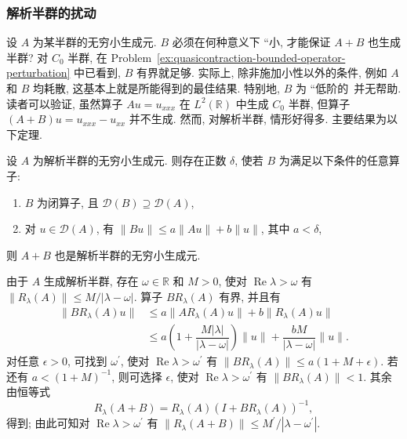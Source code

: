 \subsubsection{解析半群的扰动}\label{subsec:analytic-semigroup-perturbations}

设 $A$ 为某半群的无穷小生成元. $B$ 必须在何种意义下 ``小\textquotesingle\textquotesingle, 才能保证 $A+B$ 也生成半群? 对 $C_0$ 半群, 在 Problem~\ref{ex:quasicontraction-bounded-operator-perturbation} 中已看到, $B$ 有界就足够. 实际上, 除非施加小性以外的条件, 例如 $A$ 和 $B$ 均耗散, 这基本上就是所能得到的最佳结果. 特别地, $B$ 为 ``低阶的\textquotesingle\textquotesingle\ 并无帮助. 读者可以验证, 虽然算子 $Au=u_{xxx}$ 在 $L^2(\mathbb{R})$ 中生成 $C_0$ 半群, 但算子 $(A+B)u=u_{xxx}-u_{xx}$ 并不生成. 然而, 对解析半群, 情形好得多. 主要结果为以下定理.

\begin{Theorem}
\label{thm:analytic-generator-small-relative-perturbation}
设 $A$ 为解析半群的无穷小生成元. 则存在正数 $\delta$, 使若 $B$ 为满足以下条件的任意算子:\begin{enumerate}\item $B$ 为闭算子, 且 $\mathcal{D}(B)\supseteq\mathcal{D}(A)$,\item 对 $u\in\mathcal{D}(A)$, 有 $\|Bu\|\leq a\|Au\|+b\|u\|$, 其中 $a<\delta$,\end{enumerate}则 $A+B$ 也是解析半群的无穷小生成元.
\end{Theorem}

\begin{Proof}
由于 $A$ 生成解析半群, 存在 $\omega\in\mathbb{R}$ 和 $M>0$, 使对 $\operatorname{Re}\lambda>\omega$ 有 $\|R_\lambda(A)\|\leq M/|\lambda-\omega|$. 算子 $BR_\lambda(A)$ 有界, 并且有\[\begin{aligned}
\|BR_\lambda(A)u\|&\leq a\|AR_\lambda(A)u\|+b\|R_\lambda(A)u\|\\
&\leq a\left(1+\dfrac{M|\lambda|}{|\lambda-\omega|}\right)\|u\|+\dfrac{bM}{|\lambda-\omega|}\|u\|.
\end{aligned}\]对任意 $\epsilon>0$, 可找到 $\omega^{\prime}$, 使对 $\operatorname{Re}\lambda>\omega^{\prime}$ 有 $\|BR_\lambda(A)\|\leq a(1+M+\epsilon)$. 若还有 $a<(1+M)^{-1}$, 则可选择 $\epsilon$, 使对 $\operatorname{Re}\lambda>\omega^{\prime}$ 有 $\|BR_\lambda(A)\|<1$. 其余由恒等式
\begin{equation}\label{eq:analytic-generator-perturbation-resolvent-identity}
R_\lambda(A+B)=R_\lambda(A)(I+BR_\lambda(A))^{-1},
\end{equation}
得到; 由此可知对 $\operatorname{Re}\lambda>\omega^{\prime}$ 有 $\|R_\lambda(A+B)\|\leq M^{\prime}/|\lambda-\omega^{\prime}|$.
\end{Proof}


